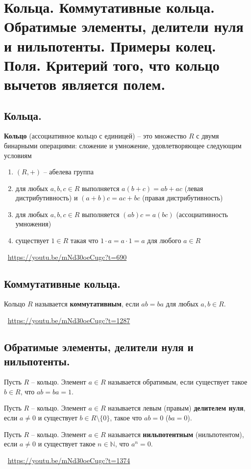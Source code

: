 \section{Кольца. Коммутативные кольца. Обратимые элементы, делители нуля и нильпотенты. Примеры колец. Поля. Критерий того, что кольцо вычетов является полем.}

\subsection{Кольца.}
\begin{definition}
    \textbf{Кольцо} (ассоциативное кольцо с единицей) -- это множество $R$ с двумя бинарными операциями: сложение и умножение, удовлетворяющее следующим условиям
    \begin{enumerate}
        \item $(R, +)$ -- абелева группа
        \item для любых $a,b,c \in R$ выполняется $a(b + c) = ab + ac$ (левая дистрибутивность) и $(a + b)c = ac + bc$ (правая дистрибутивность)
        \item для любых $a,b,c \in R$ выполняется $(ab)c = a(bc)$ (ассоциативность умножения)
        \item существует $1 \in R$ такая что $1 \cdot a = a \cdot 1 = a$ для любого $a \in R$
    \end{enumerate}
\end{definition}
\large \faYoutube \normalsize $\>$ \url{https://youtu.be/mNd30oeCugc?t=690}

\subsection{Коммутативные кольца.}
\begin{definition}
    Кольцо $R$ называется \textbf{коммутативным}, если $ab = ba$ для любых $a, b \in R$.
\end{definition}
\large \faYoutube \normalsize $\>$ \url{https://youtu.be/mNd30oeCugc?t=1287}

\subsection{Обратимые элементы, делители нуля и нильпотенты.}
\begin{definition}
    Пусть $R$ -- кольцо. Элемент $a \in R$ называется обратимым, если существует такое $b \in R$, что $ab = ba = 1$.
\end{definition}
\begin{definition}
    Пусть $R$ -- кольцо. Элемент $a \in R$ называется левым (правым) \textbf{делителем нуля}, если $a \neq 0$ и существует $b \in R \setminus \{ 0 \}$, такое что $ab = 0$ ($ba = 0$).
\end{definition}
\begin{definition}
    Пусть $R$ -- кольцо. Элемент $a \in R$ называется \textbf{нильпотентным} (нильпотентом), если $a \neq 0$ и существует такое $n \in \mathbb{N}$, что $a^n = 0$.
\end{definition}
\large \faYoutube \normalsize $\>$ \url{https://youtu.be/mNd30oeCugc?t=1374}

